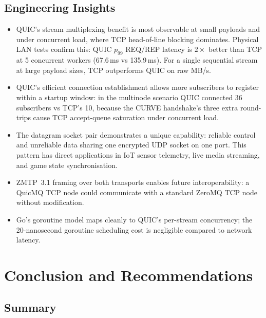 \documentclass[12pt, a4paper, oneside]{report}
\begin{document}
\section{Engineering Insights}
\label{sec:insights}

\begin{itemize}
  \item QUIC's stream multiplexing benefit is most observable at small payloads and under concurrent load, where TCP head-of-line blocking dominates. Physical LAN tests confirm this: QUIC $p_{99}$ REQ/REP latency is $2{\times}$ better than TCP at 5 concurrent workers (67.6\,ms vs 135.9\,ms). For a single sequential stream at large payload sizes, TCP outperforms QUIC on raw MB/s.

  \item QUIC's efficient connection establishment allows more subscribers to register within a startup window: in the multinode scenario QUIC connected 36 subscribers vs TCP's 10, because the CURVE handshake's three extra round-trips cause TCP accept-queue saturation under concurrent load.

  \item The datagram socket pair demonstrates a unique capability: reliable control and unreliable data sharing one encrypted UDP socket on one port. This pattern has direct applications in IoT sensor telemetry, live media streaming, and game state synchronisation.

  \item ZMTP~3.1 framing over both transports enables future interoperability: a QuicMQ TCP node could communicate with a standard ZeroMQ TCP node without modification.

  \item Go's goroutine model maps cleanly to QUIC's per-stream concurrency; the 20-nanosecond goroutine scheduling cost is negligible compared to network latency.
\end{itemize}

\chapter{Conclusion and Recommendations}
\label{ch:conclusion}

\section{Summary}
\label{sec:summary}
\end{document}
